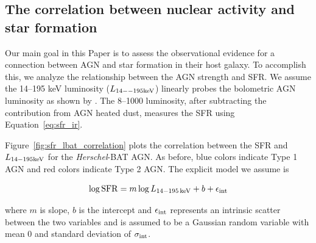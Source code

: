 \documentclass[fleqn, usenatbib]{mnras}
\newcommand{\herschel}{\emph{Herschel}}
\begin{document}
\subsection{The correlation between nuclear activity and star formation}
Our main goal in this Paper is to assess the observational evidence for a connection between AGN and star formation in their host galaxy. To accomplish this, we analyze the relationship between the AGN strength and SFR. We assume the 14--195 keV luminosity ($L_{\rm 14--195 keV}$) linearly probes the bolometric AGN luminosity as shown by \citet{Winter:2012yq}. The 8--1000 \micron{} luminosity, after subtracting the contribution from AGN heated dust, measures the SFR using Equation~\ref{eq:sfr_ir}.

Figure~\ref{fig:sfr_lbat_correlation} plots the correlation between the SFR and $L_{\rm 14-195 keV}$ for the \herschel-BAT AGN. As before, blue colors indicate Type 1 AGN and red colors indicate Type 2 AGN.  The explicit model we assume is 

\begin{equation}
\log {\rm SFR} = m\log L_{\rm 14-195\,keV} + b + \epsilon_{\rm int}
\end{equation}

\noindent where $m$ is slope, $b$ is the intercept and $\epsilon_{\rm int}$ represents an intrinsic scatter between the two variables and is assumed to be a Gaussian random variable with mean 0 and standard deviation of $\sigma_{\rm int}$. 
\end{document}
